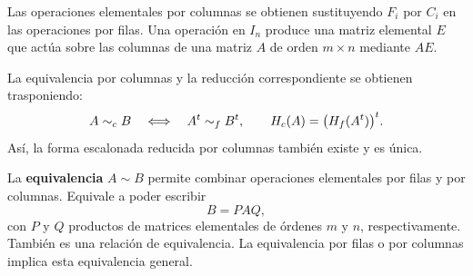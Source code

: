 Las operaciones elementales por columnas se obtienen sustituyendo
$F_i$ por $C_i$ en las operaciones por filas. Una operación en
$I_n$ produce una matriz elemental $E$ que actúa sobre las columnas
de una matriz $A$ de orden $m\times n$ mediante $AE$.

La equivalencia por columnas y la reducción correspondiente se obtienen
trasponiendo:
\[
 A\sim_c B\quad\Longleftrightarrow\quad A^t\sim_f B^t,
 \qquad H_c(A)=\bigl(H_f(A^t)\bigr)^t.
\]
Así, la forma escalonada reducida por columnas también existe y es única.

La \textbf{equivalencia} $A\sim B$ permite combinar operaciones elementales
por filas y por columnas. Equivale a poder escribir
\[
 B=PAQ,
\]
con $P$ y $Q$ productos de matrices elementales de órdenes $m$ y $n$,
respectivamente. También es una relación de equivalencia. La equivalencia
por filas o por columnas implica esta equivalencia general.
